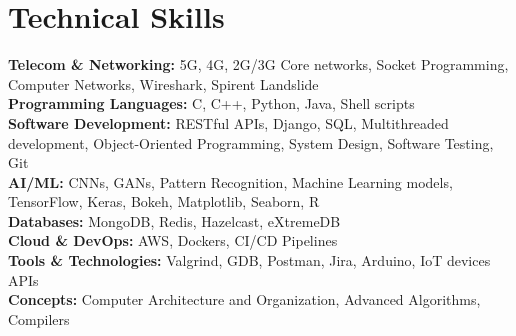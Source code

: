 \section{Technical Skills}
\begin{itemize}[leftmargin=0.15in, label={}]
	\small{\item{
			\textbf{Telecom \& Networking:} 5G, 4G, 2G/3G Core networks, Socket Programming, Computer Networks, Wireshark, Spirent Landslide \\
			\textbf{Programming Languages:} C, C++, Python, Java, Shell scripts \\
			\textbf{Software Development:} RESTful APIs, Django, SQL, Multithreaded development, Object-Oriented Programming, System Design, Software Testing, Git \\
			\textbf{AI/ML:} CNNs, GANs, Pattern Recognition, Machine Learning models, TensorFlow, Keras, Bokeh, Matplotlib, Seaborn, R \\
			\textbf{Databases:} MongoDB, Redis, Hazelcast, eXtremeDB \\
			\textbf{Cloud \& DevOps:} AWS, Dockers, CI/CD Pipelines \\
			\textbf{Tools \& Technologies:} Valgrind, GDB, Postman, Jira, Arduino, IoT devices APIs \\
			\textbf{Concepts:} Computer Architecture and Organization, Advanced Algorithms, Compilers
	}}
\end{itemize}